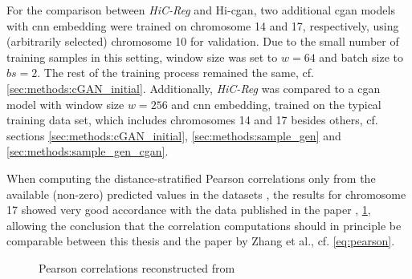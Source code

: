 For the comparison between \emph{HiC-Reg} and Hi-\acrshort{cgan}, two additional \acrshort{cgan} models with \acrshort{cnn} embedding were trained on chromosome 14 and 17, respectively,
using (arbitrarily selected) chromosome 10 for validation. 
Due to the small number of training samples in this setting, window size was set to $w=64$ and batch size to $bs=2$.
The rest of the training process remained the same, cf. \cref{sec:methods:cGAN_initial}.
Additionally, \emph{HiC-Reg} was compared to a \acrshort{cgan} model with window size $w=256$ and \acrshort{cnn} embedding, trained on the typical training data set, 
which includes chromosomes 14 and 17 besides others, cf. sections \ref{sec:methods:cGAN_initial}, \ref{sec:methods:sample_gen} and \ref{sec:methods:sample_gen_cgan}.

When computing the distance-stratified Pearson correlations only from the available (non-zero) predicted values in the datasets \cite{ShiluZhang2019,ShiluZhang2019a},
the results for chromosome 17 showed very good accordance with the data published in the paper \cite[fig.\,10]{Zhang2019}, \cref{fig:methods:zhang_correlations_reconstructed},
allowing the conclusion that the correlation computations should in principle be comparable between this thesis and the paper by Zhang et al., cf. \cref{eq:pearson}.
\begin{figure}[htbp]
 \begin{subfigure}{0.45\textwidth}
 \end{subfigure}\hfill
 \begin{subfigure}{0.45\textwidth}
 \end{subfigure}
\caption{Pearson correlations reconstructed from \cite{Zhang2019,ShiluZhang2019,ShiluZhang2019a}} \label{fig:methods:zhang_correlations_reconstructed}
\end{figure}

